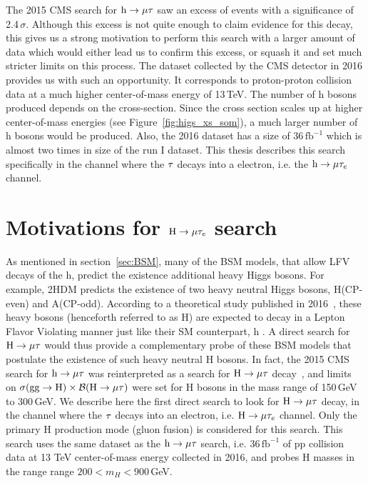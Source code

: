 The 2015 CMS search for $\text{h} \to \mu \tau$ saw an excess of events with a significance of 2.4\,$\sigma$. Although this excess is not quite enough to claim evidence for this decay, this gives us a strong motivation to perform this search with a larger amount of data which would either lead us to confirm this excess, or squash it and set much stricter limits on this process. The dataset collected by the CMS detector in 2016 provides us with such an opportunity. It corresponds to proton-proton collision data at a much higher center-of-mass energy of 13\,TeV. The number of h bosons produced depends on the cross-section. Since the cross section scales up at higher center-of-mass energies (see Figure~\ref{fig:higs_xs_som}), a much larger number of h bosons would be produced. Also, the 2016 dataset has a size of 36\,$\mathrm{fb}^{-1}$ which is almost two times in size of the run I dataset. This thesis describes this search specifically in the channel where the $\tau$ decays into a electron, i.e. the $\text{h} \to \mu \tau_{e}$ channel.   

\section{Motivations for $\text{H} \to \mu \tau_{e}$ search}
As mentioned in section~\ref{sec:BSM}, many of the BSM models, that allow LFV decays of the h, predict the existence additional heavy Higgs bosons. For example, 2HDM predicts the existence of two heavy neutral Higgs bosons, H(CP-even) and A(CP-odd). According to a theoretical study published in 2016~\cite{PhysRevD.93.055021}, these heavy bosons (henceforth referred to as H) are expected to decay in a Lepton Flavor Violating manner just like their SM counterpart, h . A direct search for $\text{H} \to \mu \tau$ would thus provide a complementary probe of these BSM models that postulate the existence of such heavy neutral H bosons. In fact, the 2015 CMS search for $\text{h} \to \mu \tau$ was reinterpreted as a search for $\text{H} \to \mu \tau$ decay~\cite{Buschmann:2016pb}, and limits on $\sigma(\textrm{gg}\rightarrow \text{H})\times\mathcal{B}(\text{H} \to \mu \tau)$ were set for H bosons in the mass range of 150\,GeV to 300\,GeV. We describe here the first direct search to look for $\text{H} \to \mu \tau$ decay, in the channel where the $\tau$ decays into an electron, i.e. $\text{H} \to \mu \tau_{e}$ channel. Only the primary H production mode (gluon fusion) is considered for this search. This search uses the same dataset as the $\text{h} \to \mu \tau$ search, i.e. 36\,$\mathrm{fb}^{-1}$ of pp collision data at 13 TeV center-of-mass energy collected in 2016, and probes H masses in the range range $200<m_H<900$\,GeV. 

